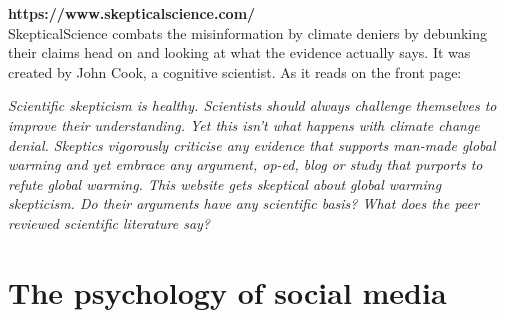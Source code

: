 \documentclass[11pt]{article}
\begin{document}
\textbf{https://www.skepticalscience.com/}\\
SkepticalScience combats the misinformation by climate deniers by debunking their
claims head on and looking at what the evidence actually says. It was created by
John Cook, a cognitive scientist. As it reads on the front page:

\begin{displayquote}
\textit{Scientific skepticism is healthy. Scientists should always challenge themselves to
improve their understanding. Yet this isn't what happens with climate change denial.
Skeptics vigorously criticise any evidence that supports man-made global warming and
yet embrace any argument, op-ed, blog or study that purports to refute global warming.
This website gets skeptical about global warming skepticism. Do their arguments have
any scientific basis? What does the peer reviewed scientific literature say?}
\end{displayquote}

\section{The psychology of social media}

\subsection{}
\end{document}
